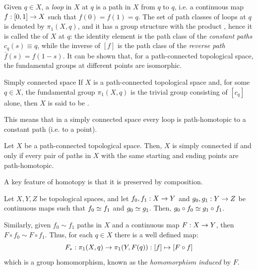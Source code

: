 Given $ q \in X $, a \emph{loop} in $ X $ at $ q $ is a path in $ X $ from $ q $ to $ q $, i.e. a continuous map $ f : [0,1] \rightarrow X $ such that $ f(0) = f(1) = q $. The set of path classes of loops at $ q $ is denoted by $ \pi_1(X,q) $, and it has a group structure with the product , hence it is called the  of $ X $ at $ q $: the identity element is the path class of the \emph{constant paths} $ c_q(s) \equiv q $, while the inverse of $ [f] $ is the path class of the \emph{reverse path} $ \bar{f}(s) = f(1-s) $. It can be shown that, for a path-connected topological space, the fundamental groups at different points are isomorphic.

\begin{definition}{Simply connected space}{}
  If $ X $ is a path-connected topological space and, for some $ q \in X $, the fundamental group $ \pi_1(X,q) $ is the trivial group consisting of $ [c_q] $ alone, then $ X $ is said to be .
\end{definition}

This means that in a simply connected space every loop is path-homotopic to a constant path (i.e. to a point).

\begin{proposition}{}{}
  Let $ X $ be a path-connected topological space. Then, $ X $ is simply connected if and only if every pair of paths in $ X $ with the same starting and ending points are path-homotopic.
\end{proposition}

A key feature of homotopy is that it is preserved by composition.

\begin{proposition}{}{}
  Let $ X,Y,Z $ be topological spaces, and let $ f_0,f_1 : X \rightarrow Y $ and $ g_0,g_1 : Y \rightarrow Z $ be continuous maps such that $ f_0 \simeq f_1 $ and $ g_0 \simeq g_1 $. Then, $ g_0 \circ f_0 \simeq g_1 \circ f_1 $.
\end{proposition}

Similarly, given $ f_0 \sim f_1 $ paths in $ X $ and a continuous map $ F : X \rightarrow Y $, then $ F \circ f_0 \sim F \circ f_1 $. Thus, for each $ q \in X $ there is a well defined map:
\begin{equation}
  F_* : \pi_1(X,q) \rightarrow \pi_1(Y,F(q)) : [f] \mapsto [F \circ f]
\end{equation}
which is a group homomorphism, known as the \emph{homomorphism induced} by $ F $.


